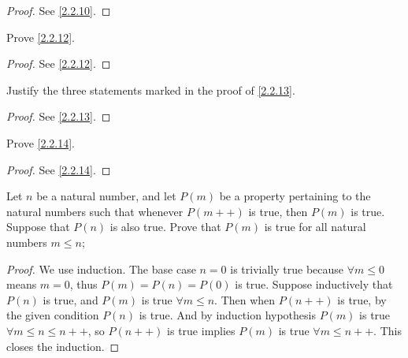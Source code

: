 \begin{proof}
  See \cref{2.2.10}.
\end{proof}

\begin{ex}\label{ex:2.2.3}
  Prove \cref{2.2.12}.
\end{ex}

\begin{proof}
  See \cref{2.2.12}.
\end{proof}

\begin{ex}\label{ex:2.2.4}
  Justify the three statements marked in the proof of \cref{2.2.13}.
\end{ex}

\begin{proof}
  See \cref{2.2.13}.
\end{proof}

\begin{ex}\label{ex:2.2.5}
  Prove \cref{2.2.14}.
\end{ex}

\begin{proof}
  See \cref{2.2.14}.
\end{proof}

\begin{ex}\label{ex:2.2.6}
  Let \(n\) be a natural number, and let \(P(m)\) be a property pertaining to the natural numbers such that whenever \(P(m++)\) is true, then \(P(m)\) is true.
  Suppose that \(P(n)\) is also true.
  Prove that \(P(m)\) is true for all natural numbers \(m \leq n\);
\end{ex}

\begin{proof}
  We use induction.
  The base case \(n = 0\) is trivially true because \(\forall m \leq 0\) means \(m = 0\), thus \(P(m) = P(n) = P(0)\) is true.
  Suppose inductively that \(P(n)\) is true, and \(P(m)\) is true \(\forall m \leq n\).
  Then when \(P(n++)\) is true, by the given condition \(P(n)\) is true.
  And by induction hypothesis \(P(m)\) is true \(\forall m \leq n \leq n++\), so \(P(n++)\) is true implies \(P(m)\) is true \(\forall m \leq n++\).
  This closes the induction.
\end{proof}
